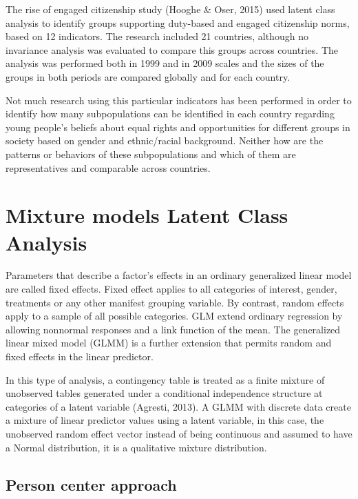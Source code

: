 \documentclass[12pt,a4paper,oneside]{reedthesis}
\begin{document}
The rise of engaged citizenship study (Hooghe \& Oser, 2015) used latent class analysis to identify groups supporting duty-based and engaged citizenship norms, based on 12 indicators. The research included 21 countries, although no invariance analysis was evaluated to compare this groups across countries. The analysis was performed both in 1999 and in 2009 scales and the sizes of the groups in both periods are compared globally and for each country.

Not much research using this particular indicators has been performed in order to identify how many subpopulations can be identified in each country regarding young people's beliefs about equal rights and opportunities for different groups in society based on gender and ethnic/racial background. Neither how are the patterns or behaviors of these subpopulations and which of them are representatives and comparable across countries.

\hypertarget{mixture-models-latent-class-analysis}{%
\section{Mixture models Latent Class Analysis}\label{mixture-models-latent-class-analysis}}

Parameters that describe a factor's effects in an ordinary generalized linear model are called fixed effects. Fixed effect applies to all categories of interest, gender, treatments or any other manifest grouping variable. By contrast, random effects apply to a sample of all possible categories. GLM extend ordinary regression by allowing nonnormal responses and a link function of the mean. The generalized linear mixed model (GLMM) is a further extension that permits random and fixed effects in the linear predictor.

In this type of analysis, a contingency table is treated as a finite mixture of unobserved tables generated under a conditional independence structure at categories of a latent variable (Agresti, 2013).
A GLMM with discrete data create a mixture of linear predictor values using a latent variable, in this case, the unobserved random effect vector instead of being continuous and assumed to have a Normal distribution, it is a qualitative mixture distribution.

\hypertarget{person-center-approach}{%
\subsection{Person center approach}\label{person-center-approach}}
\end{document}
